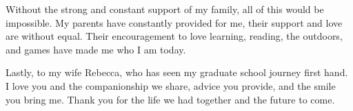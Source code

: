 Without the strong and constant support of my family, all of this would be impossible. My parents have constantly provided for me, their support and love are without equal. Their encouragement to love learning, reading, the outdoors, and games have made me who I am today. 

Lastly, to my wife Rebecca, who has seen my graduate school journey first hand. I love you and the companionship we share, advice you provide, and the smile you bring me. Thank you for the life we had together and the future to come.